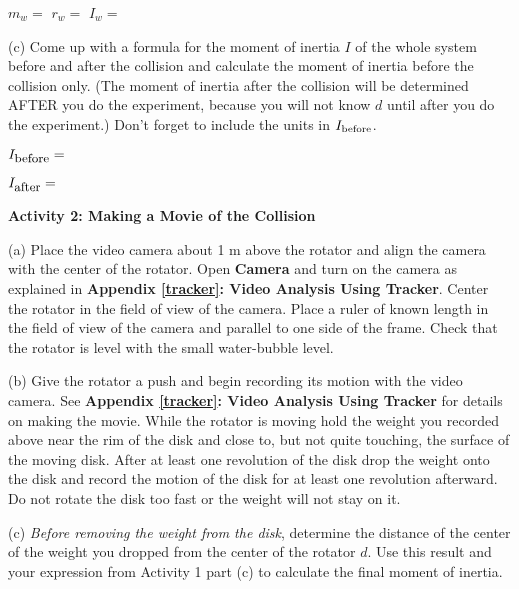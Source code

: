 $m_w=$ \hspace{22mm} $r_w=$ \hspace{22mm} $I_w =$ \hfill{}  
\vspace{10mm}



\pagebreak[2]
(c) Come up with a formula for the moment of inertia $I$ of the whole system
before and after the collision and calculate the moment of inertia before the
collision only. (The moment of inertia after the collision will be determined AFTER you do the experiment, because you will not know \(d \) until after you do the experiment.) Don't forget to include the units in \( I_{\rm before} \).
\vspace{5mm}

\( I_{\mbox{\small before}}= \) 
\vspace{5mm}

\( I_{\mbox{\small after}} =\)  
\vspace{5mm}

\textbf{Activity 2: Making a Movie of the Collision} 

(a) Place the video camera about 1 m above the rotator and align the camera with
the center of the rotator. Open \textbf{Camera} and turn on the camera as explained 
in \textbf{Appendix \ref{tracker}: Video Analysis Using Tracker}.  Center the rotator in the
field of view of the camera. Place a ruler of known length in the field of view of the camera and parallel to one side of the frame. Check that the rotator is level with the small water-bubble level.

(b) Give the rotator a push and begin recording its motion with the video camera. See \textbf{Appendix \ref{tracker}: Video Analysis Using Tracker} for details on making the movie. 
While the rotator is moving hold the weight you recorded above near the rim of the disk and 
close to, but not quite touching, the surface of the moving disk. After at least one revolution
of the disk drop the weight onto the disk and record the motion of the disk for at least one 
revolution afterward. Do not rotate the disk too fast or the weight will not stay on it.

(c) \textit{Before removing the weight from the disk}, determine the distance of the center of the weight you dropped from the center of the rotator $d$. 
Use this result and your expression from Activity 1 part (c) to calculate the final moment of inertia.
\answerspace{5mm}

